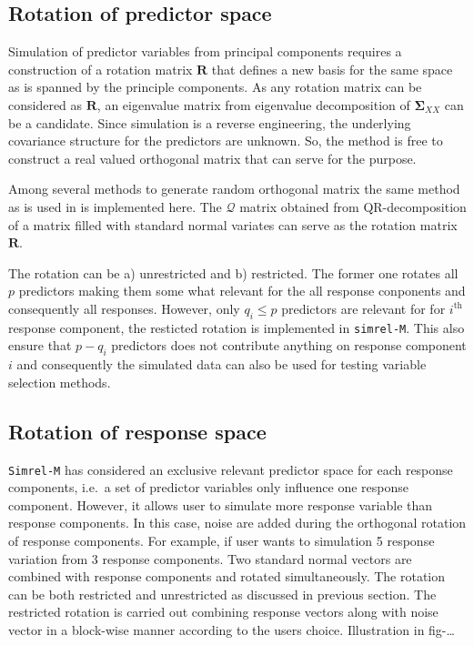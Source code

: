 \documentclass[12pt,a4paperpaper,authoryear]{elsarticle} %
\begin{document}
\subsection{Rotation of predictor space}\label{rotation-predictor-space}

Simulation of predictor variables from principal components requires a
construction of a rotation matrix \(\mathbf{R}\) that defines a new
basis for the same space as is spanned by the principle components. As
any rotation matrix can be considered as \(\mathbf{R}\), an eigenvalue
matrix from eigenvalue decomposition of \(\boldsymbol{\Sigma}_{XX}\) can
be a candidate. Since simulation is a reverse engineering, the
underlying covariance structure for the predictors are unknown. So, the
method is free to construct a real valued orthogonal matrix that can
serve for the purpose.

Among several methods
\citep{anderson1987generation, heiberger1978algorithm} to generate
random orthogonal matrix the same method as is used in
\citet{saebo2015simrel} is implemented here. The \(\mathcal{Q}\) matrix
obtained from QR-decomposition of a matrix filled with standard normal
variates can serve as the rotation matrix \(\mathbf{R}\).

The rotation can be a) unrestricted and b) restricted. The former one
rotates all \(p\) predictors making them some what relevant for the all
response conponents and consequently all responses. However, only
\(q_i \le p\) predictors are relevant for for \(i^\text{th}\) response
component, the resticted rotation is implemented in \texttt{simrel-M}.
This also ensure that \(p-q_i\) predictors does not contribute anything
on response component \(i\) and consequently the simulated data can also
be used for testing variable selection methods.

\subsection{Rotation of response space}\label{rotation-response-space}

\texttt{Simrel-M} has considered an exclusive relevant predictor space
for each response components, i.e.~a set of predictor variables only
influence one response component. However, it allows user to simulate
more response variable than response components. In this case, noise are
added during the orthogonal rotation of response components. For
example, if user wants to simulation 5 response variation from 3
response components. Two standard normal vectors are combined with
response components and rotated simultaneously. The rotation can be both
restricted and unrestricted as discussed in previous section. The
restricted rotation is carried out combining response vectors along with
noise vector in a block-wise manner according to the users choice.
Illustration in fig-\ldots{}
\end{document}
